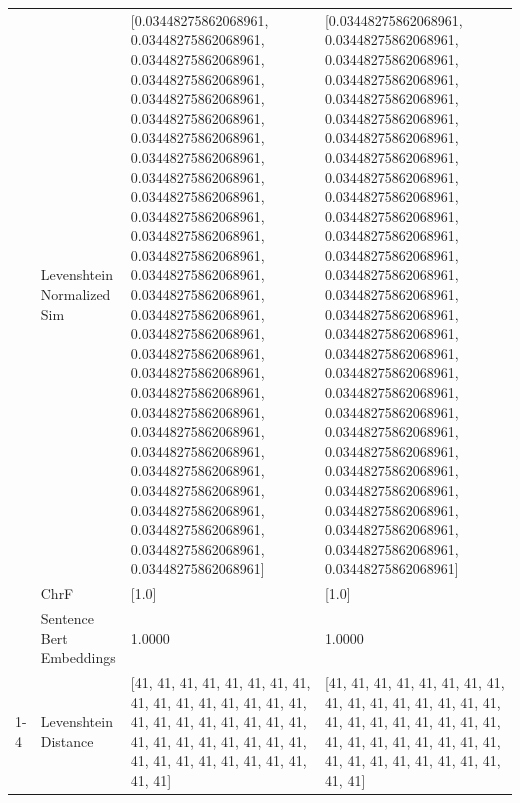 \begin{tabular}{llll}
 & Levenshtein Normalized Sim & [0.03448275862068961, 0.03448275862068961, 0.03448275862068961, 0.03448275862068961, 0.03448275862068961, 0.03448275862068961, 0.03448275862068961, 0.03448275862068961, 0.03448275862068961, 0.03448275862068961, 0.03448275862068961, 0.03448275862068961, 0.03448275862068961, 0.03448275862068961, 0.03448275862068961, 0.03448275862068961, 0.03448275862068961, 0.03448275862068961, 0.03448275862068961, 0.03448275862068961, 0.03448275862068961, 0.03448275862068961, 0.03448275862068961, 0.03448275862068961, 0.03448275862068961, 0.03448275862068961, 0.03448275862068961, 0.03448275862068961, 0.03448275862068961] & [0.03448275862068961, 0.03448275862068961, 0.03448275862068961, 0.03448275862068961, 0.03448275862068961, 0.03448275862068961, 0.03448275862068961, 0.03448275862068961, 0.03448275862068961, 0.03448275862068961, 0.03448275862068961, 0.03448275862068961, 0.03448275862068961, 0.03448275862068961, 0.03448275862068961, 0.03448275862068961, 0.03448275862068961, 0.03448275862068961, 0.03448275862068961, 0.03448275862068961, 0.03448275862068961, 0.03448275862068961, 0.03448275862068961, 0.03448275862068961, 0.03448275862068961, 0.03448275862068961, 0.03448275862068961, 0.03448275862068961, 0.03448275862068961] \\
 & ChrF & [1.0] & [1.0] \\
 & Sentence Bert Embeddings & 1.0000 & 1.0000 \\
\cline{1-4}
\multirow[t]{4}{*}{Obororo tibonyora obuya k'omoyo.} & Levenshtein Distance & [41, 41, 41, 41, 41, 41, 41, 41, 41, 41, 41, 41, 41, 41, 41, 41, 41, 41, 41, 41, 41, 41, 41, 41, 41, 41, 41, 41, 41, 41, 41, 41, 41, 41, 41, 41, 41, 41, 41, 41, 41, 41] & [41, 41, 41, 41, 41, 41, 41, 41, 41, 41, 41, 41, 41, 41, 41, 41, 41, 41, 41, 41, 41, 41, 41, 41, 41, 41, 41, 41, 41, 41, 41, 41, 41, 41, 41, 41, 41, 41, 41, 41, 41, 41] \\

\end{tabular}

